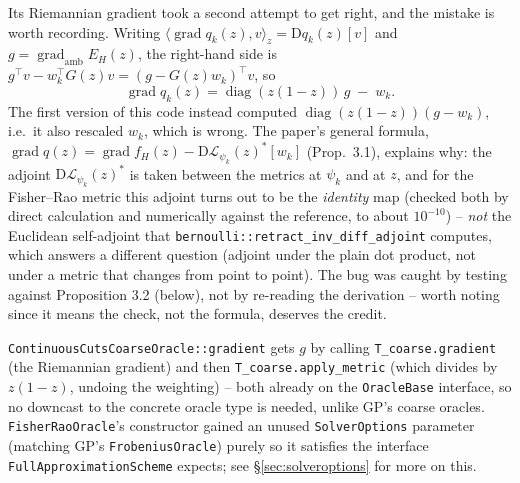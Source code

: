 \documentclass[11pt]{article}
\begin{document}
Its Riemannian gradient took a second attempt to get right, and the mistake is worth
recording. Writing $\langle\operatorname{grad}q_k(z),v\rangle_z=\mathrm Dq_k(z)[v]$ and
$g=\operatorname{grad}_{\mathrm{amb}}E_H(z)$, the right-hand side is
$g^\top v - w_k^\top G(z)v = (g-G(z)w_k)^\top v$, so
\[
  \operatorname{grad}q_k(z) = \operatorname{diag}(z(1-z))\,g \;-\; w_k.
\]
The first version of this code instead computed $\operatorname{diag}(z(1-z))(g-w_k)$,
i.e.\ it also rescaled $w_k$, which is wrong. The paper's general formula,
$\operatorname{grad}q(z)=\operatorname{grad}f_H(z)-\mathrm D\mathcal L_{\psi_k}(z)^*[w_k]$
(Prop.~3.1), explains why: the adjoint $\mathrm D\mathcal L_{\psi_k}(z)^*$ is taken between
the metrics at $\psi_k$ and at $z$, and for the Fisher--Rao metric this adjoint turns out to
be the \emph{identity} map (checked both by direct calculation and numerically against the
reference, to about $10^{-10}$) -- \emph{not} the Euclidean self-adjoint that
\texttt{bernoulli::retract\_inv\_diff\_adjoint} computes, which answers a different
question (adjoint under the plain dot product, not under a metric that changes from point
to point). The bug was caught by testing against Proposition 3.2 (below), not by re-reading
the derivation -- worth noting since it means the check, not the formula, deserves the
credit.

\texttt{ContinuousCutsCoarseOracle::gradient} gets $g$ by calling \texttt{T\_coarse.gradient}
(the Riemannian gradient) and then \texttt{T\_coarse.apply\_metric} (which divides by
$z(1-z)$, undoing the weighting) -- both already on the \texttt{OracleBase} interface, so no
downcast to the concrete oracle type is needed, unlike GP's coarse oracles.
\texttt{FisherRaoOracle}'s constructor gained an unused \texttt{SolverOptions} parameter
(matching GP's \texttt{FrobeniusOracle}) purely so it satisfies the interface
\texttt{FullApproximationScheme} expects; see \S\ref{sec:solveroptions} for more on this.
\end{document}
